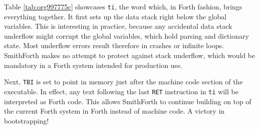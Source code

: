 \documentclass[a4paper,12pt,final]{article}
\begin{document}
Table \ref{tab:org997775c} showcases \texttt{ti}, the word which, in Forth fashion,
brings everything together.  It first sets up the data stack right
below the global variables.  This is interesting in practice, because
any accidental data stack underflow might corrupt the global
variables, which hold parsing and dictionary state.  Most underflow
errors result therefore in crashes or infinite loops.  SmithForth
makes no attempt to protect against stack underflow, which would be
mandatory in a Forth system intended for production use.

Next, \texttt{TBI} is set to point in memory just after the machine code
section of the executable.  In effect, any text following the last
\texttt{RET} instruction in \texttt{ti} will be interpreted as Forth code.  This
allows SmithForth to continue building on top of the current Forth
system in Forth instead of machine code.  A victory in bootstrapping!
\end{document}
